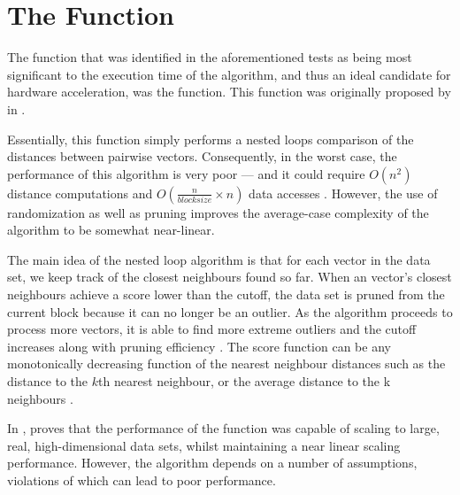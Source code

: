 \section{The Function}
\label{profiling:function}
The function that was identified in the aforementioned tests as being most
significant to the execution time of the  algorithm, and thus an ideal candidate for hardware acceleration, was the
 function. This function was originally
proposed by \citeauthor{Bay:2003} in .

Essentially, this function simply performs a nested loops comparison of the
distances between pairwise vectors. Consequently, in the worst case, the
performance of this algorithm is very poor --- and it could require $O(n^2)$
distance computations and $O(\frac{n}{blocksize} \times n)$ data accesses
\cite{Bay:2003}. However, the use of randomization as well as pruning improves
the average-case complexity of the algorithm to be somewhat near-linear.

The main idea of the nested loop algorithm is that for each vector in the data
set, we keep track of the closest neighbours found so far. When an vector's
closest neighbours achieve a score lower than the cutoff, the data set is pruned
from the current block because it can no longer be an outlier. As the algorithm
proceeds to process more vectors, it is able to find more extreme outliers and
the cutoff increases along with pruning efficiency \cite{Bay:2003}. The score
function can be any monotonically decreasing function of the nearest neighbour
distances such as the distance to the $k$th nearest neighbour, or the average
distance to the k neighbours \cite{Bay:2003}.

In , \citeauthor{Bay:2003} proves that the performance of
the  function was capable of scaling to
large, real, high-dimensional data sets, whilst maintaining a near linear
scaling performance. However, the algorithm depends on a number of assumptions,
violations of which can lead to poor performance.

